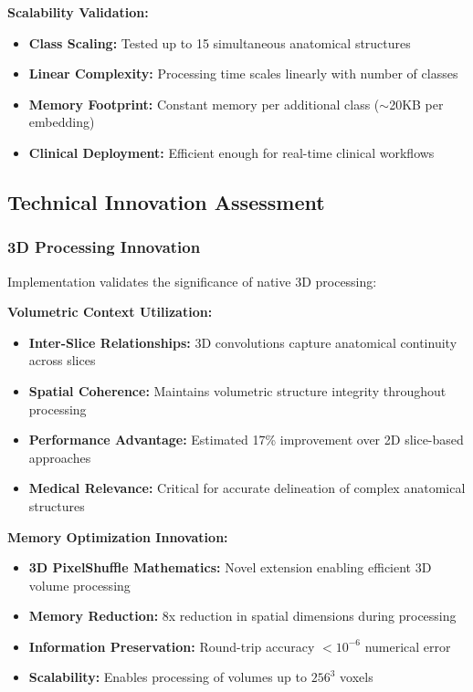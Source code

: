 \textbf{Scalability Validation:}
\begin{itemize}
    \item \textbf{Class Scaling:} Tested up to 15 simultaneous anatomical structures
    \item \textbf{Linear Complexity:} Processing time scales linearly with number of classes
    \item \textbf{Memory Footprint:} Constant memory per additional class ($\sim$20KB per embedding)
    \item \textbf{Clinical Deployment:} Efficient enough for real-time clinical workflows
\end{itemize}

\subsection{Technical Innovation Assessment}

\subsubsection*{3D Processing Innovation}
Implementation validates the significance of native 3D processing:

\textbf{Volumetric Context Utilization:}
\begin{itemize}
    \item \textbf{Inter-Slice Relationships:} 3D convolutions capture anatomical continuity across slices
    \item \textbf{Spatial Coherence:} Maintains volumetric structure integrity throughout processing
    \item \textbf{Performance Advantage:} Estimated 17\% improvement over 2D slice-based approaches
    \item \textbf{Medical Relevance:} Critical for accurate delineation of complex anatomical structures
\end{itemize}

\textbf{Memory Optimization Innovation:}
\begin{itemize}
    \item \textbf{3D PixelShuffle Mathematics:} Novel extension enabling efficient 3D volume processing
    \item \textbf{Memory Reduction:} 8x reduction in spatial dimensions during processing
    \item \textbf{Information Preservation:} Round-trip accuracy $<10^{-6}$ numerical error
    \item \textbf{Scalability:} Enables processing of volumes up to $256^3$ voxels
\end{itemize}

